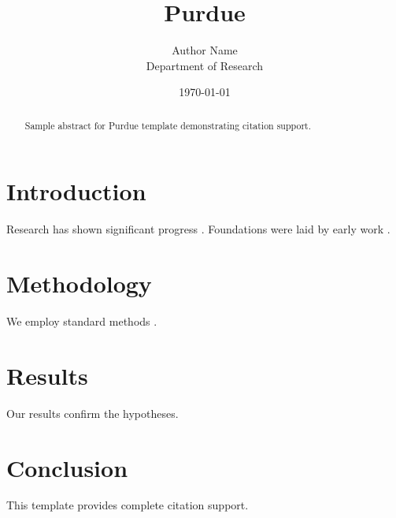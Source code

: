 \documentclass{thesis_purdue}
\title{Purdue}
\author{Author Name \\ \small Department of Research}
\date{\today}
\begin{document}
\maketitle

\begin{abstract}
Sample abstract for Purdue template demonstrating citation support.
\end{abstract}

\section{Introduction}
Research has shown significant progress \citep{einstein1905}. Foundations were laid by early work \citep{turing1950}.

\section{Methodology}
We employ standard methods \citep{knuth1984}.

\section{Results}
Our results confirm the hypotheses.

\section{Conclusion}
This template provides complete citation support.



\end{document}
